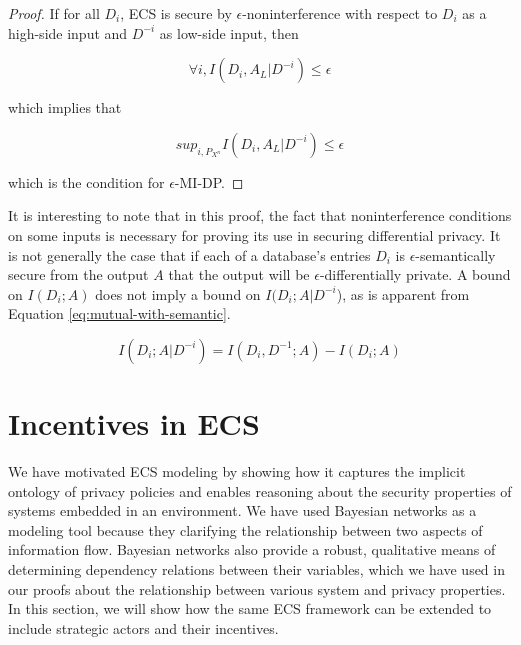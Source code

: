 \documentclass[../thesis.tex]{subfiles}
\begin{document}
\begin{center}
\end{center}
\begin{proof}
  If for all $D_i$,
  ECS is secure by $\epsilon$-noninterference with
  respect to $D_i$ as a high-side input and $D^{-i}$
  as low-side input,
  then
  
  $$\forall i, I(D_i, A_L \vert D^{-i}) \leq \epsilon$$

  which implies that

  $$sup_{i, P_{X^n}} I(D_i, A_L \vert D^{-i}) \leq \epsilon$$

  which is the condition for $\epsilon$-MI-DP.
\end{proof}

It is interesting to note that in this proof,
the fact that noninterference conditions on some
inputs is necessary for proving its use in
securing differential privacy.
It is not generally the case that if
each of a database's entries $D_i$
is $\epsilon$-semantically secure
from the output $A$ that the output
will be $\epsilon$-differentially private.
A bound on $I(D_i;A)$ does not imply a
bound on $I(D_i; A \vert D^{-i}$), as
is apparent from Equation \ref{eq:mutual-with-semantic}.

\begin{equation}
  \label{eq:mutual-with-semantic}
  I(D_i;A \vert D^{-i}) = I(D_i,D^{-1}; A) - I(D_i;A)
\end{equation}

\section{Incentives in ECS}
\label{sec:incentives}

We have motivated ECS modeling by showing how it
captures the implicit ontology of privacy policies
and enables reasoning about the security properties
of systems embedded in an environment.
We have used Bayesian networks as a modeling tool
because they clarifying the relationship between
two aspects of information flow.
Bayesian networks also provide a robust, qualitative
means of determining dependency relations between their
variables, which we have used in our proofs about the
relationship between various system and privacy properties.
In this section, we will show how the same ECS framework
can be extended to include strategic actors and their incentives.
\end{document}
